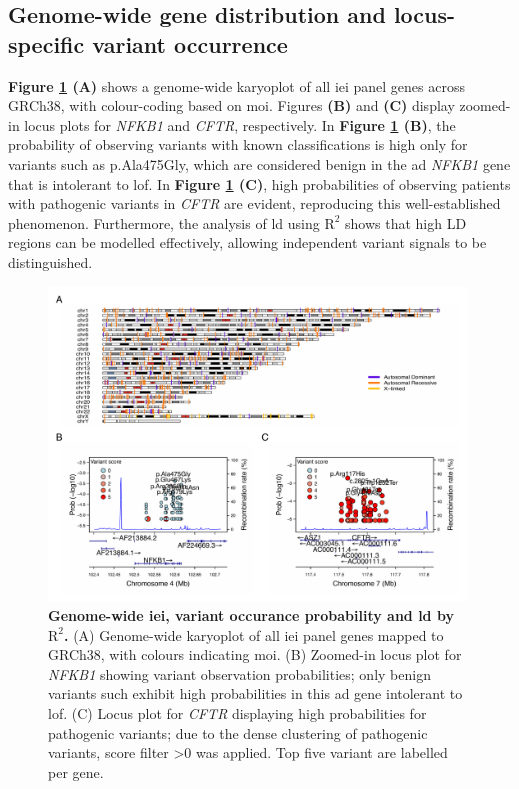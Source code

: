 \subsection{Genome-wide gene distribution and locus-specific variant occurrence}

\textbf{Figure \ref{fig:karyo_locusplot_merged} (A)} shows a genome-wide karyoplot of all \ac{iei} panel genes across GRCh38, with colour-coding based on \ac{moi}. Figures \textbf{(B)} and \textbf{(C)} display zoomed-in locus plots for \textit{NFKB1} and \textit{CFTR}, respectively. 
In \textbf{Figure \ref{fig:karyo_locusplot_merged} (B)}, the probability of observing variants with known classifications is high only for variants such as p.Ala475Gly, which are considered benign in the \ac{ad} \textit{NFKB1} gene that is intolerant to \ac{lof}. 
In \textbf{Figure \ref{fig:karyo_locusplot_merged} (C)}, high probabilities of observing patients with pathogenic variants in \textit{CFTR} are evident, reproducing this well-established phenomenon. Furthermore, the analysis of \ac{ld} using $\text{R}^2$ shows that high LD regions can be modelled effectively, allowing independent variant signals to be distinguished.

\begin{figure}[ht]
  \centering
  \includegraphics[width=0.99\textwidth]{../images/karyo_locusplot_merged.pdf}
  \caption{\textbf{Genome-wide \ac{iei}, variant occurance probability and \ac{ld} by $\text{R}^2$.} (A) Genome-wide karyoplot of all \ac{iei} panel genes mapped to GRCh38, with colours indicating \ac{moi}. (B) Zoomed-in locus plot for \textit{NFKB1} showing variant observation probabilities; only benign variants such exhibit high probabilities in this \ac{ad} gene intolerant to \ac{lof}. (C) Locus plot for \textit{CFTR} displaying high probabilities for pathogenic variants; due to the dense clustering of pathogenic variants, score filter >0 was applied. Top five variant are labelled per gene.}
  \label{fig:karyo_locusplot_merged}
\end{figure}

